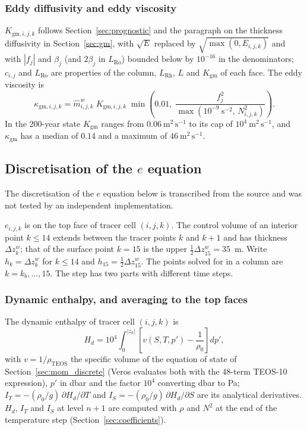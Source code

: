 \documentclass{article}
\begin{document}
\subsubsection*{Eddy diffusivity and eddy viscosity}
$K_{\text{gm},i,j,k}$ follows Section~\ref{sec:prognostic} and the paragraph on the thickness diffusivity in Section~\ref{sec:gm}, with $\sqrt{E}$ replaced by $\sqrt{\max(0,E_{i,j,k})}$ and with $|f_j|$ and $\beta_j$ (and $2\beta_j$ in $L_\text{Ro}$) bounded below by $10^{-16}$ in the denominators; $c_{i,j}$ and $L_\text{Ro}$ are properties of the column, $L_\text{Rh}$, $L$ and $K_\text{gm}$ of each face. The eddy viscosity is
\[
\kappa_{\text{gm},i,j,k} = \hat m^w_{i,j,k}\; K_{\text{gm},i,j,k}\; \min\!\left( 0.01,\; \frac{f_j^2}{\max(10^{-9}~\text{s}^{-2},\, N^2_{i,j,k})} \right).
\]
In the 200-year state $K_\text{gm}$ ranges from $0.06~\text{m}^2\,\text{s}^{-1}$ to its cap of $10^4~\text{m}^2\,\text{s}^{-1}$, and $\kappa_\text{gm}$ has a median of $0.14$ and a maximum of $46~\text{m}^2\,\text{s}^{-1}$.

\subsection{\texorpdfstring{Discretisation of the $e$ equation}{Discretisation of the e equation}}\label{sec:tke_discrete}

The discretisation of the $e$ equation below is transcribed from the source and was not tested by an independent implementation.

$e_{i,j,k}$ is on the top face of tracer cell $(i,j,k)$. The control volume of an interior point $k \le 14$ extends between the tracer points $k$ and $k+1$ and has thickness $\Delta z^w_k$; that of the surface point $k=15$ is the upper $\tfrac12\Delta z^w_{15} = 35$~m. Write $h_k = \Delta z^w_k$ for $k \le 14$ and $h_{15} = \tfrac12\Delta z^w_{15}$.
The points solved for in a column are $k = k_b, \dots, 15$.
The step has two parts with different time steps.

\subsubsection*{Dynamic enthalpy, and averaging to the top faces}
The dynamic enthalpy of tracer cell $(i,j,k)$ is
\[
H_{d} = 10^4 \int_0^{|z_k|} \left[ v(S, T, p') - \frac{1}{\rho_0} \right] dp' ,
\]
with $v = 1/\rho_\text{TEOS}$ the specific volume of the equation of state of Section~\ref{sec:mom_discrete} (Veros evaluates both with the 48-term TEOS-10 expression), $p'$ in dbar and the factor $10^4$ converting dbar to Pa; $I_T = -(\rho_0/g)\,\partial H_d/\partial T$ and $I_S = -(\rho_0/g)\,\partial H_d/\partial S$ are its analytical derivatives. $H_d$, $I_T$ and $I_S$ at level $n+1$ are computed with $\rho$ and $N^2$ at the end of the temperature step (Section~\ref{sec:coefficients}).
\end{document}

